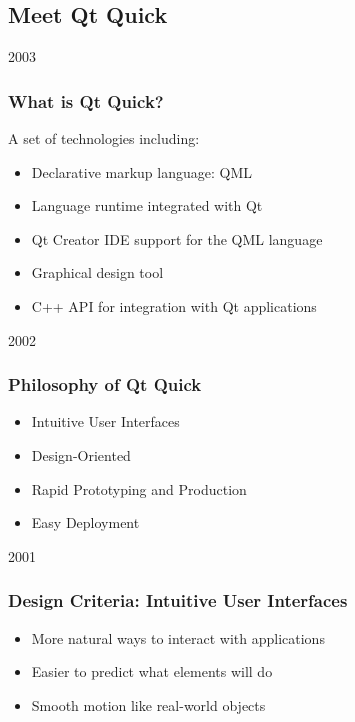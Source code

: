 %
%
%
%

\subsection{Meet Qt Quick}

\begin{slide}{2003}\frametitle{What is Qt Quick?}
\vspace*{1.5em}

A set of technologies including:
\begin{itemize}
\item Declarative markup language: QML
\item Language runtime integrated with Qt
\item Qt Creator IDE support for the QML language
\item Graphical design tool
\item C++ API for integration with Qt applications
\end{itemize}
\end{slide}

\begin{slide}{2002}\frametitle{Philosophy of Qt Quick}
\vspace*{1.5em}

\begin{itemize}
\item Intuitive User Interfaces
\item Design-Oriented
\item Rapid Prototyping and Production
\item Easy Deployment
\end{itemize}
\end{slide}


\begin{slide}{2001}\frametitle{Design Criteria: Intuitive User Interfaces}



\begin{itemize}
\item More natural ways to interact with applications
\item Easier to predict what elements will do
\item Smooth motion like real-world objects
\end{itemize}

\end{slide}

